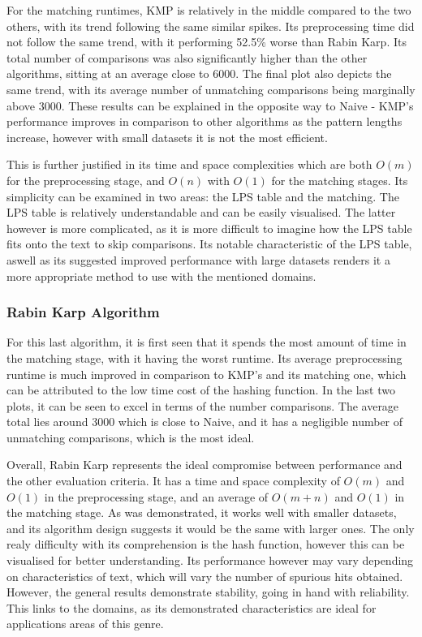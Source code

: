 \documentclass[12pt]{article}
\begin{document}
For the matching runtimes, KMP is relatively in the middle compared to the two others, with its trend following the same similar spikes. Its preprocessing time did not follow the same trend, with it performing 52.5\% worse than Rabin Karp. Its total number of comparisons was also significantly higher than the other algorithms, sitting at an average close to 6000. The final plot also depicts the same trend, with its average number of unmatching comparisons being marginally above 3000. These results can be explained in the opposite way to Naive - KMP’s performance improves in comparison to other algorithms as the pattern lengths increase, however with small datasets it is not the most efficient.

This is further justified in its time and space complexities which are both $O(m)$ for the preprocessing stage, and $O(n)$ with $O(1)$ for the matching stages. Its simplicity can be examined in two areas: the LPS table and the matching. The LPS table is relatively understandable and can be easily visualised. The latter however is more complicated, as it is more difficult to imagine how the LPS table fits onto the text to skip comparisons. Its notable characteristic of the LPS table, aswell as its suggested improved performance with large datasets renders it a more appropriate method to use with the mentioned domains.

\subsubsection{Rabin Karp Algorithm}

For this last algorithm, it is first seen that it spends the most amount of time in the matching stage, with it having the worst runtime. Its average preprocessing runtime is much improved in comparison to KMP’s and its matching one, which can be attributed to the low time cost of the hashing function. In the last two plots, it can be seen to excel in terms of the number comparisons. The average total lies around 3000 which is close to Naive, and it has a negligible number of unmatching comparisons, which is the most ideal.

Overall, Rabin Karp represents the ideal compromise between performance and the other evaluation criteria. It has a time and space complexity of $O(m)$ and $O(1)$ in the preprocessing stage, and an average of $O(m+n)$ and $O(1)$ in the matching stage. As was demonstrated, it works well with smaller datasets, and its algorithm design suggests it would be the same with larger ones. The only realy difficulty with its comprehension is the hash function, however this can be visualised for better understanding. Its performance however may vary depending on characteristics of text, which will vary the number of spurious hits obtained. However, the general results demonstrate stability, going in hand with reliability. This links to the domains, as its demonstrated characteristics are ideal for applications areas of this genre.
\end{document}
